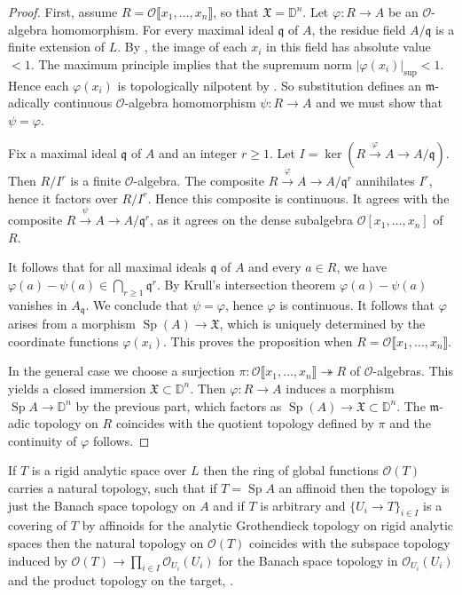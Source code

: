 \documentclass{amsart}
\theoremstyle{definition}
\theoremstyle{remark}
\DeclareMathOperator{\Sp}{Sp}
\newcommand{\mm}{\mathfrak m}
\newcommand{\OO}{\mathcal O}
\newcommand{\br}[1]{\llbracket #1\rrbracket}
\begin{document}
\begin{proof}
    First, assume $R=\OO\br{x_1,\ldots,x_n}$, so that $\mathfrak X=\mathbb D^n$.
    Let $\varphi:R\to A$ be an $\OO$-algebra homomorphism.
    For every maximal ideal $\mathfrak q$ of $A$, the residue field $A/\mathfrak q$ is a finite extension of $L$.
    By \cite[Lemmas 3.17 and 3.18(4)]{BIP_new}, the image of each $x_i$ in this field has absolute value $<1$.
    The maximum principle \cite[Theorem 3.1/15]{bosch} implies that the supremum norm $|\varphi(x_i)|_{\sup}<1$. 
    Hence each $\varphi(x_i)$ is topologically nilpotent by \cite[Corollary 3.1/18]{bosch}.
    So substitution defines an $\mm$-adically continuous $\OO$-algebra homomorphism $\psi : R \to A$ and we must show that $\psi = \varphi$.
    
    Fix a maximal ideal $\mathfrak q$ of $A$ and an integer $r \geq 1$.
    Let $I = \ker(R \xrightarrow{\varphi} A \to A/\mathfrak q)$.
    Then $R/I^r$ is a finite $\OO$-algebra.
    The composite $R\xrightarrow{\varphi}A\to A/\mathfrak q^r$ annihilates $I^r$, hence it factors over $R/I^r$. Hence this composite is continuous.
    It agrees with the composite $R\xrightarrow{\psi}A\to A/\mathfrak q^r$, as it agrees on the dense subalgebra $\OO[x_1, \ldots, x_n]$ of $R$.
    
    It follows that for all maximal ideals $\mathfrak q$ of $A$ and every $a \in R$, we have $\varphi(a) - \psi(a) \in \bigcap_{r \geq 1} \mathfrak q^r$.
    By Krull's intersection theorem $\varphi(a) - \psi(a)$ vanishes in $A_{\mathfrak q}$.
    We conclude that $\psi = \varphi$, hence $\varphi$ is continuous.
    It follows that $\varphi$ arises from a morphism $\Sp(A) \to \mathfrak X$, which is uniquely determined by the coordinate functions $\varphi(x_i)$.
    This proves the proposition when $R=\OO\br{x_1,\ldots,x_n}$.
    
    In the general case we choose a surjection 
    $\pi:\OO\br{x_1,\ldots, x_n}\twoheadrightarrow R$ of $\OO$-algebras. This yields a closed immersion 
    $\mathfrak X \subset \mathbb D^n$. Then 
    $\varphi: R \rightarrow  A$ induces a morphism 
    $\Sp A \rightarrow \mathbb D^n$ by the previous part, which factors as $\Sp(A)\rightarrow \mathfrak X\subset \mathbb D^n$. The $\mm$-adic topology on $R$ coincides with the quotient topology defined by $\pi$ and the continuity of $\varphi$ follows.
\end{proof}


If $T$ is a rigid analytic space over $L$ then the ring 
of global functions $\OO(T)$ carries a natural topology, 
such that if $T= \Sp A$ an affinoid then the topology is just
the Banach space topology on $A$ and if $T$ is arbitrary and 
$\{U_i\rightarrow T\}_{i\in I}$ is a covering of $T$ by affinoids for the analytic Grothendieck topology on rigid analytic
spaces then the natural topology on $\OO(T)$ coincides
with the subspace topology induced by $\OO(T)\rightarrow \prod_{i\in I} \OO_{U_i}(U_i)$ for the Banach space topology in $\OO_{U_i}(U_i)$ and the product topology on the target, 
\cite[Section 4.1]{DPS}. 
\end{document}
